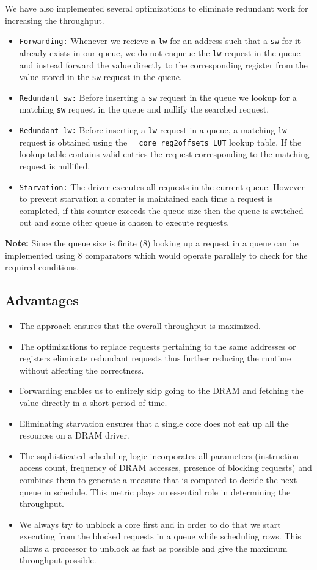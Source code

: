 \documentclass[hidelinks,12pt]{article}
\begin{document}
We have also implemented several optimizations to eliminate redundant work for increasing the throughput.

\begin{itemize}
    \item \verb|Forwarding:| Whenever we recieve a \verb|lw| for an address such that a \verb|sw| for it already exists in our queue, we do not enqueue the \verb|lw| request in the queue and instead forward the value directly to the corresponding register
          from the value stored in the \verb|sw| request in the queue.
    \item \verb|Redundant sw:| Before inserting a \verb|sw| request in the queue we lookup for a matching \verb|sw| request in the queue and nullify the searched request.
    \item \verb|Redundant lw:| Before inserting a \verb|lw| request in a queue, a matching \verb|lw| request is obtained using the \verb|__core_reg2offsets_LUT| lookup table.
          If the lookup table contains valid entries the request corresponding to the matching request is nullified.
    \item \verb|Starvation:| The driver executes all requests in the current queue. However to prevent starvation a counter is maintained each time a request is completed,
          if this counter exceeds the queue size then the queue is switched out and some other queue is chosen to execute requests.
\end{itemize}

\textbf{Note:} Since the queue size is finite ($8$) looking up a request in a queue can be implemented using $8$ comparators which would operate parallely to check for the required conditions.

\subsection{Advantages}
\begin{itemize}
    \item The approach ensures that the overall throughput is maximized.
    \item The optimizations to replace requests pertaining to the same addresses or registers eliminate redundant requests thus further reducing the runtime without affecting the correctness.
    \item Forwarding enables us to entirely skip going to the DRAM and fetching the value directly in a short period of time.
    \item Eliminating starvation ensures that a single core does not eat up all the resources on a DRAM driver.
    \item The sophisticated scheduling logic incorporates all parameters (instruction access count, frequency of DRAM accesses, presence of blocking requests) and combines them to generate a measure that is compared to decide the next queue in schedule. This metric plays an essential role in determining the throughput.
    \item We always try to unblock a core first and in order to do that we start executing from the blocked requests in a queue while scheduling rows. This allows a processor to unblock as fast as possible and give the maximum throughput possible.
\end{itemize}
\end{document}
